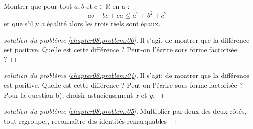 \documentclass[main.tex]{subfiles}
\begin{document}
 
\begin{problem}\label{chapter08:problem:05} 
Montrer que pour tout $a,b$ et $c\in\mathbb{R}$ on a :
	$$
	ab+bc+ca\leqslant a^2+b^2+c^2
	$$
et que s'il y a égalité alors les trois réels sont égaux. 
\end{problem}
  
\begin{proof}[solution du problème \ref{chapter08:problem:00}]
	Il s’agit de montrer que la différence est positive. Quelle est cette différence ? Peut-on
	l’écrire sous forme factorisée ?
\end{proof}
 

\begin{proof}[solution du problème \ref{chapter08:problem:04}]
	Il s’agit de montrer que la différence est positive. Quelle est cette différence ? Peut-on	l’écrire sous forme factorisée ? 
	Pour la question b), choisir astucieusement $x$ et $y$.
\end{proof}
\begin{proof}[solution du problème \ref{chapter08:problem:05}]
	 Multiplier par deux des deux côtés, tout regrouper, reconnaître des identités remarquables
\end{proof}


	
	

%	 
\cleardoublepage 
%	
\end{document}
